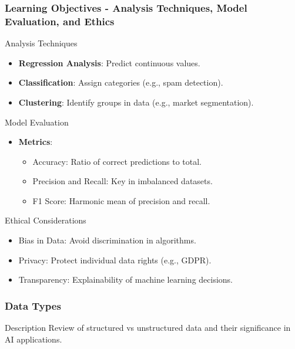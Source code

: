 \documentclass[aspectratio=169]{beamer}
\begin{document}
\begin{frame}[fragile]
    \frametitle{Learning Objectives - Analysis Techniques, Model Evaluation, and Ethics}
    
    \begin{block}{Analysis Techniques}
        \begin{itemize}
            \item \textbf{Regression Analysis}: Predict continuous values.
            \item \textbf{Classification}: Assign categories (e.g., spam detection).
            \item \textbf{Clustering}: Identify groups in data (e.g., market segmentation).
        \end{itemize}
    \end{block}

    \begin{block}{Model Evaluation}
        \begin{itemize}
            \item \textbf{Metrics}:
                \begin{itemize}
                    \item Accuracy: Ratio of correct predictions to total.
                    \item Precision and Recall: Key in imbalanced datasets.
                    \item F1 Score: Harmonic mean of precision and recall.
                \end{itemize}
        \end{itemize}
    \end{block}

    \begin{block}{Ethical Considerations}
        \begin{itemize}
            \item Bias in Data: Avoid discrimination in algorithms.
            \item Privacy: Protect individual data rights (e.g., GDPR).
            \item Transparency: Explainability of machine learning decisions.
        \end{itemize}
    \end{block}
\end{frame}

\begin{frame}[fragile]
    \frametitle{Data Types}
    \begin{block}{Description}
        Review of structured vs unstructured data and their significance in AI applications.
    \end{block}
\end{frame}
\end{document}
